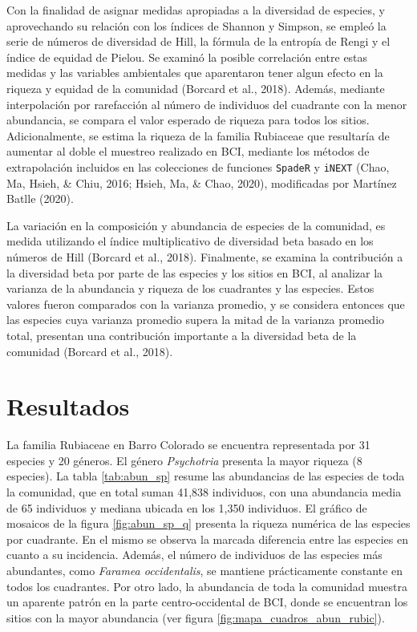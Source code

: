 \documentclass[11pt,]{article}
\begin{document}
Con la finalidad de asignar medidas apropiadas a la diversidad de
especies, y aprovechando su relación con los índices de Shannon y
Simpson, se empleó la serie de números de diversidad de Hill, la fórmula
de la entropía de Rengi y el índice de equidad de Pielou. Se examinó la
posible correlación entre estas medidas y las variables ambientales que
aparentaron tener algun efecto en la riqueza y equidad de la comunidad
(Borcard et al., 2018). Además, mediante interpolación por rarefacción
al número de individuos del cuadrante con la menor abundancia, se
compara el valor esperado de riqueza para todos los sitios.
Adicionalmente, se estima la riqueza de la familia Rubiaceae que
resultaría de aumentar al doble el muestreo realizado en BCI, mediante
los métodos de extrapolación incluidos en las colecciones de funciones
\texttt{SpadeR} y \texttt{iNEXT} (Chao, Ma, Hsieh, \& Chiu, 2016; Hsieh,
Ma, \& Chao, 2020), modificadas por Martínez Batlle (2020).

La variación en la composición y abundancia de especies de la comunidad,
es medida utilizando el índice multiplicativo de diversidad beta basado
en los números de Hill (Borcard et al., 2018). Finalmente, se examina la
contribución a la diversidad beta por parte de las especies y los sitios
en BCI, al analizar la varianza de la abundancia y riqueza de los
cuadrantes y las especies. Estos valores fueron comparados con la
varianza promedio, y se considera entonces que las especies cuya
varianza promedio supera la mitad de la varianza promedio total,
presentan una contribución importante a la diversidad beta de la
comunidad (Borcard et al., 2018).

\section{Resultados}\label{resultados}

La familia Rubiaceae en Barro Colorado se encuentra representada por 31
especies y 20 géneros. El género \emph{Psychotria} presenta la mayor
riqueza (8 especies). La tabla \ref{tab:abun_sp} resume las abundancias
de las especies de toda la comunidad, que en total suman 41,838
individuos, con una abundancia media de 65 individuos y mediana ubicada
en los 1,350 individuos. El gráfico de mosaicos de la figura
\ref{fig:abun_sp_q} presenta la riqueza numérica de las especies por
cuadrante. En el mismo se observa la marcada diferencia entre las
especies en cuanto a su incidencia. Además, el número de individuos de
las especies más abundantes, como \emph{Faramea occidentalis}, se
mantiene prácticamente constante en todos los cuadrantes. Por otro lado,
la abundancia de toda la comunidad muestra un aparente patrón en la
parte centro-occidental de BCI, donde se encuentran los sitios con la
mayor abundancia (ver figura \ref{fig:mapa_cuadros_abun_rubic}).
\end{document}
